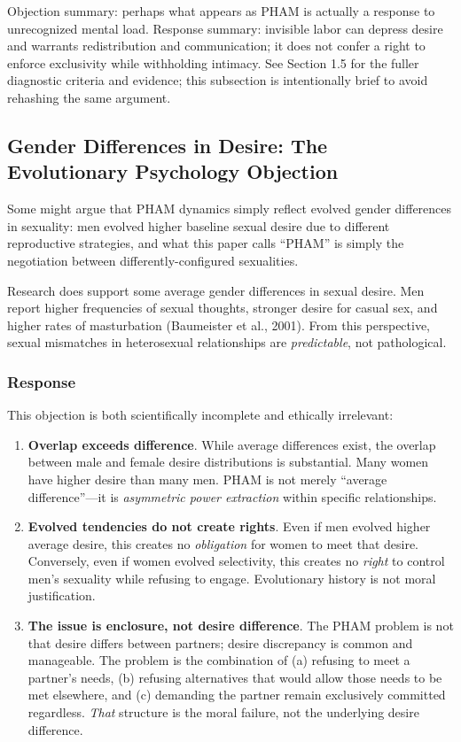 \documentclass[12pt, letterpaper]{article}
\begin{document}
Objection summary: perhaps what appears as PHAM is actually a response to unrecognized mental load. Response summary: invisible labor can depress desire and warrants redistribution and communication; it does not confer a right to enforce exclusivity while withholding intimacy. See Section 1.5 for the fuller diagnostic criteria and evidence; this subsection is intentionally brief to avoid rehashing the same argument.

\subsection{Gender Differences in Desire: The Evolutionary Psychology Objection}

Some might argue that PHAM dynamics simply reflect evolved gender differences in sexuality: men evolved higher baseline sexual desire due to different reproductive strategies, and what this paper calls ``PHAM'' is simply the negotiation between differently-configured sexualities.

Research does support some average gender differences in sexual desire. Men report higher frequencies of sexual thoughts, stronger desire for casual sex, and higher rates of masturbation (Baumeister et al., 2001). From this perspective, sexual mismatches in heterosexual relationships are \textit{predictable}, not pathological.

\subsubsection{Response}

This objection is both scientifically incomplete and ethically irrelevant:

\begin{enumerate}
    \item \textbf{Overlap exceeds difference}. While average differences exist, the overlap between male and female desire distributions is substantial. Many women have higher desire than many men. PHAM is not merely ``average difference''---it is \textit{asymmetric power extraction} within specific relationships.
    
    \item \textbf{Evolved tendencies do not create rights}. Even if men evolved higher average desire, this creates no \textit{obligation} for women to meet that desire. Conversely, even if women evolved selectivity, this creates no \textit{right} to control men's sexuality while refusing to engage. Evolutionary history is not moral justification.
    
    \item \textbf{The issue is enclosure, not desire difference}. The PHAM problem is not that desire differs between partners; desire discrepancy is common and manageable. The problem is the combination of (a) refusing to meet a partner's needs, (b) refusing alternatives that would allow those needs to be met elsewhere, and (c) demanding the partner remain exclusively committed regardless. \textit{That} structure is the moral failure, not the underlying desire difference.
\end{enumerate}
\end{document}
